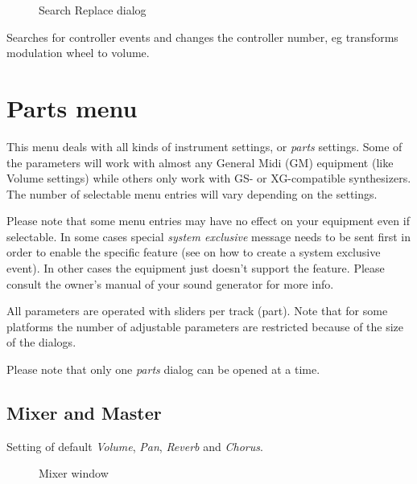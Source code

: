 \documentclass[letterpaper]{report}
\begin{document}
\begin{figure}%
%
%
\caption{Search Replace dialog}%
\end{figure}

Searches for controller events and changes the controller number, eg
transforms modulation wheel to volume.





\section{Parts menu}\label{partsmenu}

This menu deals with all kinds of instrument settings, or {\em parts} settings.
Some of the parameters will work with
almost any General Midi (GM) equipment (like Volume settings) while
others only work with GS- or XG-compatible synthesizers. The number of
selectable menu entries will vary depending on the
 settings.

Please note that some
menu entries may have no effect on your equipment even if selectable. In some
cases special {\em system exclusive} message needs to be sent
first in order to enable the specific feature
(see  on how to create a
system exclusive event).
In other cases the equipment just doesn't support the feature.
Please consult the owner's manual of your sound generator for more info.

All parameters are operated with sliders per track (part). Note that for some
platforms the number of adjustable parameters are restricted because of
the size of the dialogs.

Please note that only one {\em parts} dialog can be opened at a time.

\subsection{Mixer and Master}\label{mixer}

Setting of default {\em Volume}, {\em Pan}, {\em Reverb} and {\em Chorus}.

\begin{figure}%
%
%
\caption{Mixer window}%
\end{figure}
\end{document}
